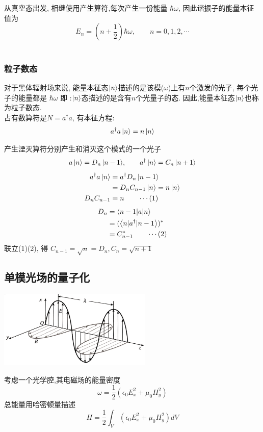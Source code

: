 从真空态出发, 相继使用产生算符,每次产生一份能量 $ \hbar \omega$, 因此谐振子的能量本征值为
\[\boxed{E_n = (n+\frac{1}{2})\hbar \omega, \qquad n=0,1,2, \cdots}  \] 
~~\\

\subsubsection{粒子数态}

对于黑体辐射场来说, 能量本征态$\left|n\right\rangle$描述的是该模($\omega$)上有$n$个激发的光子, 每个光子的能量都是 $\hbar \omega$ 即 :$\left|n\right\rangle$态描述的是含有$n$个光量子的态. 因此,能量本征态$\left|n\right\rangle$也称为粒子数态. \\ 

占有数算符是$ N=a^\dagger a $, 有本征方程:
\[ a^\dagger a \left|n\right\rangle= n\left|n\right\rangle\] 

产生湮灭算符分别产生和消灭这个模式的一个光子
\[ {a \left|n\right\rangle= D_n\left|n-1\right\rangle}, \qquad a^\dagger \left|n\right\rangle= C_n \left|n+1\right\rangle \]  
\[ 
  \begin{aligned}
    a^\dagger a \left|n\right\rangle &= a^\dagger D_n\left|n-1\right\rangle \\ 
    &= D_n C_{n-1} \left|n\right\rangle = n \left|n\right\rangle \\ 
    D_n C_{n-1}&=n \qquad \cdots (1)
  \end{aligned}
  \] 
  \[ 
    \begin{aligned}
      D_n &=  \left\langle n-1 | a | n \right\rangle \\
      &=  (\left\langle n | a^\dagger  | n-1 \right\rangle)^* \\
      &= C_{n-1} ^*   \qquad \cdots (2)
    \end{aligned}
    \] 
    联立(1)(2), 得 $C_{n-1}=\sqrt{n}= D_n, C_{n}=\sqrt{n+1} $\\ 

\subsection{单模光场的量子化}

\begin{center}
     \includegraphics[width=0.55\textwidth]{figs/43.png}
\end{center}
考虑一个光学腔,其电磁场的能量密度 
\[ \omega = \frac{1}{2} (\epsilon_0 E^2 _x + \mu_0 H^2 _y) \]
总能量用哈密顿量描述
\[ H = \frac{1}{2} \int_V (\epsilon_0 E^2 _x + \mu_0 H^2 _y) dV \]

